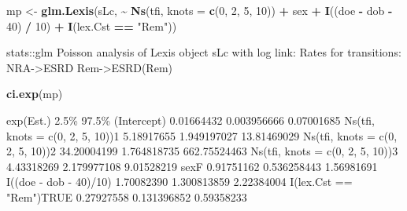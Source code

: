 \documentclass[
]{book}
\newenvironment{Shaded}{\begin{snugshade}}{\end{snugshade}}
\newcommand{\AttributeTok}[1]{\textcolor[rgb]{0.13,0.29,0.53}{#1}}
\newcommand{\DecValTok}[1]{\textcolor[rgb]{0.00,0.00,0.81}{#1}}
\newcommand{\FunctionTok}[1]{\textcolor[rgb]{0.13,0.29,0.53}{\textbf{#1}}}
\newcommand{\NormalTok}[1]{#1}
\newcommand{\OtherTok}[1]{\textcolor[rgb]{0.56,0.35,0.01}{#1}}
\newcommand{\SpecialCharTok}[1]{\textcolor[rgb]{0.81,0.36,0.00}{\textbf{#1}}}
\newcommand{\StringTok}[1]{\textcolor[rgb]{0.31,0.60,0.02}{#1}}
\begin{document}
\begin{enumerate}
\begin{Shaded}
\begin{Highlighting}[]
\NormalTok{mp }\OtherTok{\textless{}{-}} \FunctionTok{glm.Lexis}\NormalTok{(sLc, }
                \SpecialCharTok{\textasciitilde{}} \FunctionTok{Ns}\NormalTok{(tfi, }\AttributeTok{knots =} \FunctionTok{c}\NormalTok{(}\DecValTok{0}\NormalTok{, }\DecValTok{2}\NormalTok{, }\DecValTok{5}\NormalTok{, }\DecValTok{10}\NormalTok{)) }\SpecialCharTok{+}
\NormalTok{                  sex }\SpecialCharTok{+} \FunctionTok{I}\NormalTok{((doe }\SpecialCharTok{{-}}\NormalTok{ dob }\SpecialCharTok{{-}} \DecValTok{40}\NormalTok{) }\SpecialCharTok{/} \DecValTok{10}\NormalTok{) }\SpecialCharTok{+} 
                  \FunctionTok{I}\NormalTok{(lex.Cst }\SpecialCharTok{==} \StringTok{"Rem"}\NormalTok{))}
\end{Highlighting}
\end{Shaded}

\begin{Shaded}
\begin{Highlighting}[]
\NormalTok{stats::glm Poisson analysis of Lexis object sLc with log link:}
\NormalTok{Rates for transitions:}
\NormalTok{NRA{-}\textgreater{}ESRD}
\NormalTok{Rem{-}\textgreater{}ESRD(Rem)}
\end{Highlighting}
\end{Shaded}

\begin{Shaded}
\begin{Highlighting}[]
\FunctionTok{ci.exp}\NormalTok{(mp)}
\end{Highlighting}
\end{Shaded}

\begin{Shaded}
\begin{Highlighting}[]
\NormalTok{                                   exp(Est.)        2.5\%        97.5\%}
\NormalTok{(Intercept)                       0.01664432 0.003956666   0.07001685}
\NormalTok{Ns(tfi, knots = c(0, 2, 5, 10))1  5.18917655 1.949197027  13.81469029}
\NormalTok{Ns(tfi, knots = c(0, 2, 5, 10))2 34.20004199 1.764818735 662.75524463}
\NormalTok{Ns(tfi, knots = c(0, 2, 5, 10))3  4.43318269 2.179977108   9.01528219}
\NormalTok{sexF                              0.91751162 0.536258443   1.56981691}
\NormalTok{I((doe {-} dob {-} 40)/10)            1.70082390 1.300813859   2.22384004}
\NormalTok{I(lex.Cst == "Rem")TRUE           0.27927558 0.131396852   0.59358233}
\end{Highlighting}
\end{Shaded}


\end{enumerate}
\end{document}
